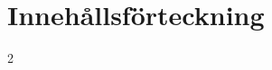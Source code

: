 \section*{Innehållsförteckning}
\renewcommand{\contentsname}{\LARGE }
    \begin{multicols*}{2}
    \setlength{\columnseprule}{0pt}
    \setlength{\columnsep}{15pt}
    \renewcommand{\cftsubsecafterpnum}{\vskip1pt} %
    \setlength{\cftbeforesecskip}{0pt}
    \setlength{\cftbeforesubsecskip}{1pt}
    \renewcommand{\cftsubsecleader}{\cftdotfill{\cftdotsep}}
    \renewcommand{\cftsubsecfont}{\normalfont}
    \renewcommand{\cftsubsecleader}{\color{TOCPageNumber}\cftdotfill{\cftdotsep}}
    {\fontsize{11.5pt}{11.5pt}\selectfont
    \hypertarget{TOC}{}
    \tableofcontents
    }
\end{multicols*}
\newpage
\fi






